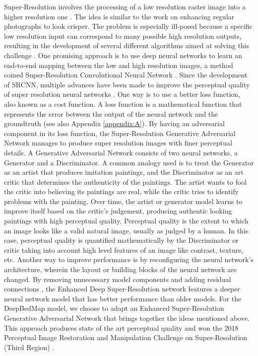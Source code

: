 \documentclass[tc, manuscript]{copernicus}
\begin{document}
Super-Resolution involves the processing of a low resolution raster image into a higher resolution one \citep{TsaiMultiframeimagerestoration1984}.
The idea is similar to the work on enhancing regular photographs to look crisper.
The problem is especially ill-posed because a specific low resolution input can correspond to many possible high resolution outputs, resulting in the development of several different algorithms aimed at solving this challenge \citep[see][for a review]{NasrollahiSuperresolutioncomprehensivesurvey2014}.
One promising approach is to use deep neural networks \citep{LeCunDeeplearning2015} to learn an end-to-end mapping between the low and high resolution images, a method coined Super-Resolution Convolutional Neural Network \citep[SRCNN,][]{DongImageSuperResolutionUsing2014}.
Since the development of SRCNN, multiple advances have been made to improve the perceptual quality of super resolution neural networks \cite[see][for a review]{YangDeepLearningSingle2018}.
One way is to use a better loss function, also known as a cost function.
A loss function is a mathematical function that represents the error between the output of the neural network and the groundtruth (see also Appendix \ref{appendix:A}).
By having an adversarial component in its loss function, the Super-Resolution Generative Adversarial Network \citep[SRGAN,][]{LedigPhotoRealisticSingleImage2016} manages to produce super resolution images with finer perceptual details.
A Generative Adversarial Network \citep{GoodfellowGenerativeAdversarialNetworks2014} consists of two neural networks, a Generator and a Discriminator.
A common analogy used is to treat the Generator as an artist that produces imitation paintings, and the Discriminator as an art critic that determines the authenticity of the paintings.
The artist wants to fool the critic into believing its paintings are real, while the critic tries to identify problems with the painting.
Over time, the artist or generator model learns to improve itself based on the critic's judgement, producing authentic looking paintings with high perceptual quality.
Perceptual quality is the extent to which an image looks like a valid natural image, usually as judged by a human.
In this case, perceptual quality is quantified mathematically by the Discriminator or critic taking into account high level features of an image like contrast, texture, etc.
Another way to improve performance is by reconfiguring the neural network's architecture, wherein the layout or building blocks of the neural network are changed.
By removing unnecessary model components and adding residual connections \citep{HeDeepResidualLearning2015}, the Enhanced Deep Super-Resolution network \citep[EDSR,][]{LimEnhancedDeepResidual2017} features a deeper neural network model that has better performance than older models.
For the DeepBedMap model, we choose to adapt an Enhanced Super-Resolution Generative Adversarial Network \citep[ESRGAN,][]{WangESRGANEnhancedSuperResolution2018} that brings together the ideas mentioned above.
This approach produces state of the art perceptual quality and won the 2018 Perceptual Image Restoration and Manipulation Challenge on Super-Resolution (Third Region) \citep{Blau2018PIRMChallenge2018}.
\end{document}
